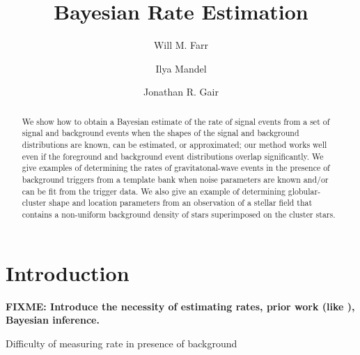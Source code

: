 \documentclass[aps,prd]{revtex4-1}
\newcommand{\fixme}[1]{\textbf{FIXME: #1}}
\begin{document}
\title{Bayesian Rate Estimation}

\author{Will M. Farr}

\author{Ilya Mandel}

\author{Jonathan R. Gair}

\begin{abstract}
  We show how to obtain a Bayesian estimate of the rate of signal
  events from a set of signal and background events when the shapes of
  the signal and background distributions are known, can be estimated,
  or approximated; our method works well even if the foreground and
  background event distributions overlap significantly.  We give
  examples of determining the rates of gravitatonal-wave events in
  the presence of background triggers from a template bank when noise
  parameters are known and/or can be fit from the trigger data.  We
  also give an example of determining globular-cluster shape and
  location parameters from an observation of a stellar field that
  contains a non-uniform background density of stars superimposed on
  the cluster stars.
\end{abstract}

\maketitle

\section{Introduction}

\fixme{Introduce the necessity of estimating rates, prior work (like
  \cite{Biswas2009}), Bayesian inference.}
  
Difficulty of measuring rate in presence of background
\end{document}
